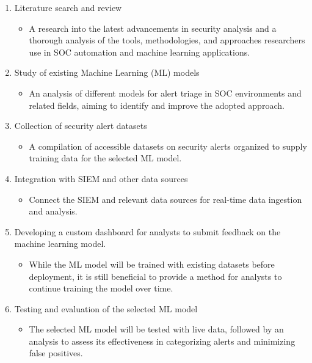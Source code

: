 \begin{enumerate}
    \item Literature search and review
    \label{objective1}
    \begin{itemize}
        \item A research into the latest advancements in security analysis and a thorough analysis of the tools, methodologies, and approaches researchers use in SOC automation and machine learning applications.
    \end{itemize}
    
    \item Study of existing Machine Learning (ML) models
    \label{objective2}
    \begin{itemize}
        \item An analysis of different models for alert triage in SOC environments and related fields, aiming to identify and improve the adopted approach.
    \end{itemize}
    
    \item Collection of security alert datasets
    \label{objective3}
    \begin{itemize}
        \item A compilation of accessible datasets on security alerts organized to supply training data for the selected ML model.
    \end{itemize}

    \item Integration with SIEM and other data sources
    \label{objective4}
    \begin{itemize}
        \item Connect the SIEM and relevant data sources for real-time data ingestion and analysis.
    \end{itemize}
    
    \item Developing a custom dashboard for analysts to submit feedback on the machine learning model.
    \label{objective5}
    \begin{itemize}
        \item While the ML model will be trained with existing datasets before deployment, it is still beneficial to provide a method for analysts to continue training the model over time.
    \end{itemize}
    
    \item Testing and evaluation of the selected ML model
    \label{objective6}
    \begin{itemize}
        \item The selected ML model will be tested with live data, followed by an analysis to assess its effectiveness in categorizing alerts and minimizing false positives.
    \end{itemize}
\end{enumerate}

